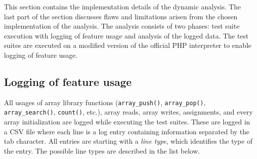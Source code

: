 This section contains the implementation details of the dynamic analysis. The last part of the section discusses flaws and limitations arisen from the chosen implementation of the analysis. The analysis consists of two phases: test suite execution with logging of feature usage and analysis of the logged data. The test suites are executed on a modified version of the official PHP interpreter to enable logging of feature usage.

\subsection{Logging of feature usage}
All usages of array library functions (\texttt{array\_push()}, \texttt{array\_pop()}, \texttt{array\_search()}, \texttt{count()}, etc.), array reads, array writes, assignments, and every array initialization are logged while executing the test suites. These are logged in a CSV file where each line is a log entry containing information separated by the tab character. All entries are starting with a \emph{line type}, which identifies the type of the entry. The possible line types are described in the list below.

